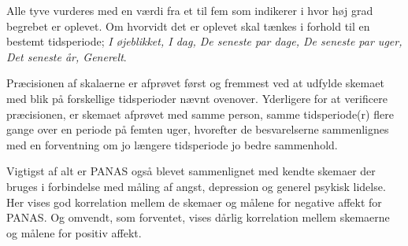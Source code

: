 Alle tyve vurderes med en værdi fra et til fem som indikerer i hvor høj grad begrebet er oplevet.
Om hvorvidt det er oplevet skal tænkes i forhold til en bestemt tidsperiode; \textit{I øjeblikket, I dag, De seneste par dage, De seneste par uger, Det seneste år, Generelt}.

Præcisionen af skalaerne er afprøvet først og fremmest ved at udfylde skemaet med blik på forskellige tidsperioder nævnt ovenover.
Yderligere for at verificere præcisionen, er skemaet afprøvet med samme person, samme tidsperiode(r) flere gange over en periode på femten uger, hvorefter de besvarelserne sammenlignes med en forventning om jo længere tidsperiode jo bedre sammenhold.

Vigtigst af alt er PANAS også blevet sammenlignet med kendte skemaer der bruges i forbindelse med måling af angst, depression og generel psykisk lidelse.
Her vises god korrelation mellem de skemaer og målene for negative affekt for PANAS.
Og omvendt, som forventet, vises dårlig korrelation mellem skemaerne og målene for positiv affekt.